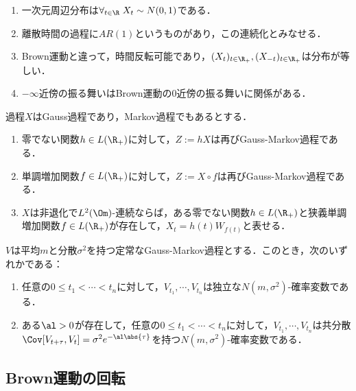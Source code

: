 \documentclass[uplatex,dvipdfmx]{jsreport}
\begin{document}
\begin{remarks}\mbox{}
    \begin{enumerate}
        \item 一次元周辺分布は$\forall_{t\in\R}\;X_t\sim N(0,1)$である．
        \item 離散時間の過程に$AR(1)$というものがあり，この連続化とみなせる．
        \item Brown運動と違って，時間反転可能であり，$(X_t)_{t\in\R_+},(X_{-t})_{t\in\R_+}$は分布が等しい．
        \item $-\infty$近傍の振る舞いはBrown運動の$0$近傍の振る舞いに関係がある．
    \end{enumerate}
\end{remarks}

\begin{theorem}
    過程$X$はGauss過程であり，Markov過程でもあるとする．
    \begin{enumerate}
        \item 零でない関数$h\in L(\R_+)$に対して，$Z:=hX$は再びGauss-Markov過程である．
        \item 単調増加関数$f\in L(\R_+)$に対して，$Z:=X\circ f$は再びGauss-Markov過程である．
        \item $X$は非退化で$L^2(\Om)$-連続ならば，ある零でない関数$h\in L(\R_+)$と狭義単調増加関数$f\in L(\R_+)$が存在して，$X_t=h(t)W_{f(t)}$と表せる．
    \end{enumerate}
\end{theorem}

\begin{proposition}
    $V$は平均$m$と分散$\sigma^2$を持つ定常なGauss-Markov過程とする．このとき，次のいずれかである：
    \begin{enumerate}
        \item 任意の$0\le t_1<\cdots<t_n$に対して，$V_{t_1},\cdots,V_{t_n}$は独立な$N(m,\sigma^2)$-確率変数である．
        \item ある$\al>0$が存在して，任意の$0\le t_1<\cdots<t_n$に対して，$V_{t_1},\cdots,V_{t_n}$は共分散$\Cov[V_{t+\tau},V_t]=\sigma^2 e^{-\al\abs{\tau}}$を持つ$N(m,\sigma^2)$-確率変数である．
    \end{enumerate}
\end{proposition}

\subsection{Brown運動の回転}
\end{document}
